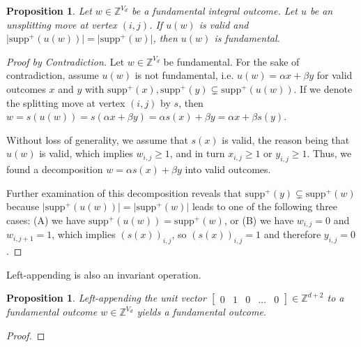 \documentclass[11pt]{article}
\newtheorem{proposition}[theorem]{Proposition}
\begin{document}
\begin{proposition}
  Let $w \in \mathbb{Z}^{V_{d}}$ be a fundamental integral outcome. Let $u$ be an unsplitting move at vertex $(i,j)$. If $u(w)$ is valid and $\vert \mathrm{supp}^+(u(w))\vert = \vert \mathrm{supp}^+(w) \vert$, then $u(w)$ is fundamental.
\end{proposition}

\begin{proof}[Proof by Contradiction]
  Let $w \in \mathbb{Z}^{V_{d}}$ be fundamental. For the sake of contradiction, assume $u(w)$ is not fundamental, i.e. $u(w) = \alpha x + \beta y$ for valid outcomes $x$ and $y$ with $\mathrm{supp}^+(x), \mathrm{supp}^+(y) \subsetneq \mathrm{supp}^+(u(w))$. If we denote the splitting move at vertex $(i,j)$ by $s$, then $w = s(u(w)) = s(\alpha x + \beta y) = \alpha s(x) + \beta y = \alpha x + \beta s(y) $.

  Without loss of generality, we assume that $s(x)$ is valid, the reason being that $u(w)$ is valid, which implies $w_{i,j} \geq 1$, and in turn $x_{i,j} \geq 1$ or $y_{i,j} \geq 1$. Thus, we found a decomposition $w = \alpha s(x) + \beta y$ into valid outcomes. 

 Further examination of this decomposition reveals that $\mathrm{supp}^+(y) \subsetneq \mathrm{supp}^+(w)$ because $\vert \mathrm{supp}^+(u(w))\vert = \vert \mathrm{supp}^+(w) \vert$ leads to one of the following three cases: (A) we have $\mathrm{supp}^+(u(w)) = \mathrm{supp}^+(w)$, or (B) we have $w_{i,j} = 0$ and $w_{i,j+1} = 1$, which implies $(s(x))_{i,j}$, so $(s(x))_{i,j} = 1$ and therefore $y_{i,j} = 0$.
\end{proof}

Left-appending is also an invariant operation. 

\begin{proposition}
  Left-appending the unit vector $\begin{bmatrix}0 & 1 & 0 & \dots & 0\end{bmatrix} \in \mathbb{Z}^{d + 2}$ to a fundamental outcome $w \in \mathbb{Z}^{V_{d}}$ yields a fundamental outcome.
\end{proposition}

\begin{proof}
  
\end{proof}
\end{document}
